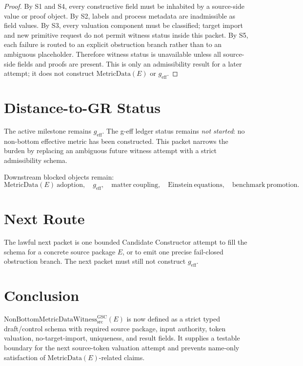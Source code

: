 \documentclass[11pt]{article}
\newcommand{\MetricData}{\mathrm{MetricData}}
\newcommand{\Witness}{\mathrm{NonBottomMetricDataWitness}_{\mathrm{src}}^{\mathrm{GSC}}}
\newcommand{\geff}{g_{\mathrm{eff}}}
\begin{document}
\begin{proof}
By S1 and S4, every constructive field must be inhabited by a source-side value
or proof object. By S2, labels and process metadata are inadmissible as field
values. By S3, every valuation component must be classified; target import and
new primitive request do not permit witness status inside this packet. By S5,
each failure is routed to an explicit obstruction branch rather than to an
ambiguous placeholder. Therefore witness status is unavailable unless all
source-side fields and proofs are present. This is only an admissibility result
for a later attempt; it does not construct \(\MetricData(E)\) or \(\geff\).
\end{proof}

\section{Distance-to-GR Status}

The active milestone remains \(\geff\). The g-eff ledger status remains
\emph{not started}: no non-bottom effective metric has been constructed. This
packet narrows the burden by replacing an ambiguous future witness attempt with
a strict admissibility schema.

Downstream blocked objects remain:
\[
  \MetricData(E)\ \mathrm{adoption},\quad
  \geff,\quad
  \mathrm{matter\ coupling},\quad
  \mathrm{Einstein\ equations},\quad
  \mathrm{benchmark\ promotion}.
\]

\section{Next Route}

The lawful next packet is one bounded Candidate Constructor attempt to fill
the schema for a concrete source package \(E\), or to emit one precise
fail-closed obstruction branch. The next packet must still not construct
\(\geff\).

\section{Conclusion}

\(\Witness(E)\) is now defined as a strict typed draft/control schema with
required source package, input authority, token valuation, no-target-import,
uniqueness, and result fields. It supplies a testable boundary for the next
source-token valuation attempt and prevents name-only satisfaction of
\(\MetricData(E)\)-related claims.
\end{document}
